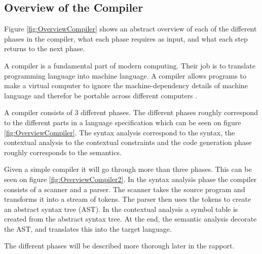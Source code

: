 \subsection{Overview of the Compiler}
\label{sec:OverviewCompiler}
Figure \ref{fig:OverviewCompiler}  shows an abstract overview of each of the different phases in the compiler, what each phase requires as input, and what each step returns to the next phase.

A compiler is a fundamental part of modern computing. Their job is to translate programming language into machine language. A compiler allows programs to make a virtual computer to ignore the machine-dependency details of machine language and therefor be portable across different computers  \citep{CraftingACompiler}.

A compiler consists of 3 different phases. The different phases roughly correspond to the different parts in a language specification which can be seen on figure \ref{fig:OverviewCompiler}. The syntax analysis correspond to the syntax, the contextual analysis to the contextual constraints and the code generation phase roughly corresponds to the semantics.

Given a simple compiler it will go through more than three phases. This can be seen on figure \ref{fig:OverviewCompiler2}. In the syntax analysis phase the compiler consists of a scanner and a parser. The scanner takes the source program and transforms it into a stream of tokens. The parser then uses the tokens to create an abstract syntax tree (AST). In the contextual analysis a symbol table is created from the abstract syntax tree. At the end, the semantic analysis decorate the AST, and translates this into the target language.

The different phases will be described more thorough later in the rapport. 

